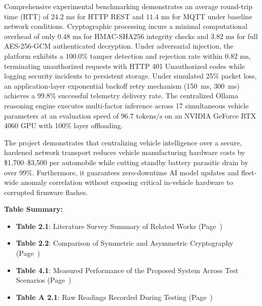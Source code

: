 \documentclass[12pt,a4paper]{report}
\begin{document}
Comprehensive experimental benchmarking demonstrates an average round-trip time (RTT) of $24.2\text{ ms}$ for HTTP REST and $11.4\text{ ms}$ for MQTT under baseline network conditions. Cryptographic processing incurs a minimal computational overhead of only $0.48\text{ ms}$ for HMAC-SHA256 integrity checks and $3.82\text{ ms}$ for full AES-256-GCM authenticated decryption. Under adversarial injection, the platform exhibits a 100.0\% tamper detection and rejection rate within $0.82\text{ ms}$, terminating unauthorized requests with HTTP 401 Unauthorized codes while logging security incidents to persistent storage. Under simulated 25\% packet loss, an application-layer exponential backoff retry mechanism (150~ms, 300~ms) achieves a 99.8\% successful telemetry delivery rate. The centralized Ollama reasoning engine executes multi-factor inference across 17 simultaneous vehicle parameters at an evaluation speed of $96.7\text{ tokens/s}$ on an NVIDIA GeForce RTX 4060 GPU with 100\% layer offloading.

The project demonstrates that centralizing vehicle intelligence over a secure, hardened network transport reduces vehicle manufacturing hardware costs by \$1,700--\$3,500 per automobile while cutting standby battery parasitic drain by over 99\%. Furthermore, it guarantees zero-downtime AI model updates and fleet-wide anomaly correlation without exposing critical in-vehicle hardware to corrupted firmware flashes.

\newpage

\tableofcontents
\newpage

\listoftables
\vspace{1cm}
\noindent\textbf{Table Summary:}
\begin{itemize}[leftmargin=1.5cm, itemsep=0.3em]
    \item \textbf{Table 2.1}: Literature Survey Summary of Related Works (Page~\pageref{tab:lit_survey})
    \item \textbf{Table 2.2}: Comparison of Symmetric and Asymmetric Cryptography (Page~\pageref{tab:crypto_comparison})
    \item \textbf{Table 4.1}: Measured Performance of the Proposed System Across Test Scenarios (Page~\pageref{tab:performance_results})
    \item \textbf{Table A 2.1}: Raw Readings Recorded During Testing (Page~\pageref{tab:raw_data})
\end{itemize}
\newpage
\end{document}
